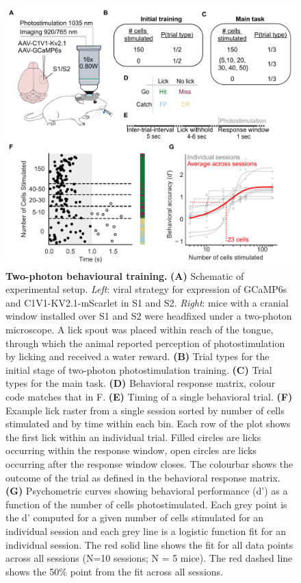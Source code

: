 \begin{figure}[h]
\includegraphics[scale=0.78]{figures/2-photon-behaviour.pdf}
\caption[\textbf{Two-photon behavioural training.}]{
\textbf{Two-photon behavioural training.}
\textbf{(A)} Schematic of experimental setup. \textit{Left}: viral strategy for expression of GCaMP6s and C1V1-KV2.1-mScarlet in S1 and S2.  \textit{Right}: mice with a cranial window installed over S1 and S2 were headfixed under a two-photon microscope. A lick spout was placed within reach of the tongue, through which the animal reported perception of photostimulation by licking and received a water reward. \textbf{(B)} Trial types for the initial stage of two-photon photostimulation training. \textbf{(C)} Trial types for the main task.  \textbf{(D)} Behavioral response matrix, colour code matches that in F. \textbf{(E)} Timing of a single behavioral trial. \textbf{(F)} Example lick raster from a single session sorted by number of cells stimulated and by time within each bin. Each row of the plot shows the first lick within an individual trial. Filled circles are licks occurring within the response window, open circles are licks occurring after the response window closes. The colourbar shows the outcome of the trial as defined in the behavioral response matrix. \textbf{(G)} Psychometric curves showing behavioral performance (d’) as a function of the number of cells photostimulated. Each grey point is the d’ computed for a given number of cells stimulated for an individual session and each grey line is a logistic function fit for an individual session. The red solid line shows the fit for all data points across all sessions (N=10 sessions; N = 5 mice). The red dashed line shows the 50\% point from the fit across all sessions. 
} 
\label{fig:2-photon-behaviour}
\end{figure}

